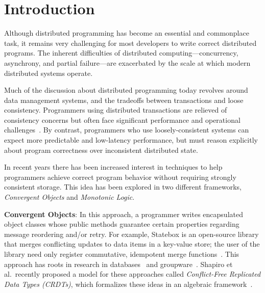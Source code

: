 \section{Introduction} 
\label{sec:intro} 
Although distributed programming has become an essential and commonplace task,
it remains very challenging for most developers to write correct distributed
programs. The inherent difficulties of distributed computing---concurrency,
asynchrony, and partial failure---are exacerbated by the scale at which modern
distributed systems operate.

Much of the discussion about distributed programming today revolves around data management systems, and the tradeoffs between transactions and loose consistency. Programmers using distributed transactions are relieved of consistency concerns but often face significant performance and operational challenges~\cite{Birman2009}. By contrast, programmers who use loosely-consistent systems can expect more predictable and low-latency performance, but must reason explicitly about program correctness over inconsistent distributed state.

In recent years there has been increased interest in techniques to help programmers achieve correct program behavior without requiring strongly consistent storage. This idea has been explored in two different frameworks, \emph{Convergent Objects} and \emph{Monotonic Logic}.

\vspace{0.5em}
\noindent \textbf{Convergent Objects}: In this approach, a programmer writes encapsulated object classes whose public methods guarantee certain properties regarding message reordering and/or retry. For example, Statebox is an open-source library that merges conflicting updates to data items in a key-value store; the user of the library need only register commutative, idempotent merge functions~\cite{statebox}. This approach has roots in research in databases~\cite{Farrag1989,Garcia-Molina1983,Helland2009} and groupware~\cite{Ellis1989,Sun1998}.  Shapiro et al.\ recently proposed a model for these approaches called {\em Conflict-Free Replicated Data Types (CRDTs)}, which formalizes these ideas in an algebraic framework~\cite{Shapiro2011b}. 

